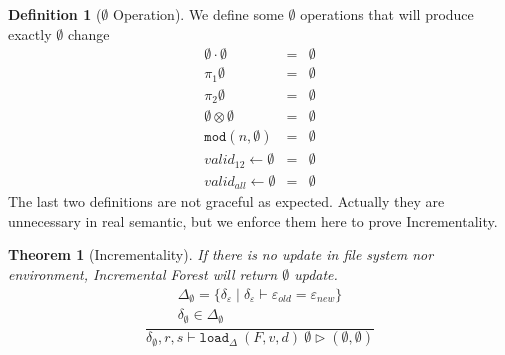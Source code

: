 \documentclass[10pt,twoside,a4paper]{article}
\theoremstyle{theorem}
\newtheorem{theorem}{Theorem}[section]
\theoremstyle{lemma}
\theoremstyle{property}
\theoremstyle{definition}
\newtheorem{definition}{Definition}[section]
\theoremstyle{assumption}
\def\fst{\pi_1}
\def\snd{\pi_2}
\begin{document}
\newpage

\begin{definition}[$\emptyset$ Operation]
We define some $\emptyset$ operations that will produce exactly $\emptyset$ change
\begin{eqnarray}
	\emptyset \cdot \emptyset &=& \emptyset\\
	\fst\emptyset &=& \emptyset\\
	\snd\emptyset &=& \emptyset\\
	\emptyset \otimes \emptyset &=& \emptyset\\
	\mathtt{mod}(n, \emptyset) &=& \emptyset\\
	valid_{12} \leftarrow \emptyset &=& \emptyset\\
	valid_{all} \leftarrow \emptyset &=& \emptyset
\end{eqnarray}
The last two definitions are not graceful as expected. Actually they are unnecessary in real semantic, but we enforce them here to prove Incrementality.
\end{definition}

\begin{theorem}[Incrementality]
If there is no update in file system nor environment, Incremental Forest will return $\emptyset$ update.
\begin{displaymath}
\frac{\begin{array}{c}
	\Delta_{\emptyset} = \{\delta_\varepsilon \mid \delta_\varepsilon \vdash \varepsilon_{old} = \varepsilon_{new}\} \\
	\delta_{\emptyset} \in \Delta_{\emptyset}
\end{array}}
	{\delta_{\emptyset}, r, s \vdash \mathtt{load}_\Delta~ (F,v,d)~ \emptyset \rhd (\emptyset, \emptyset)}
\end{displaymath}

\end{theorem}
\end{document}
